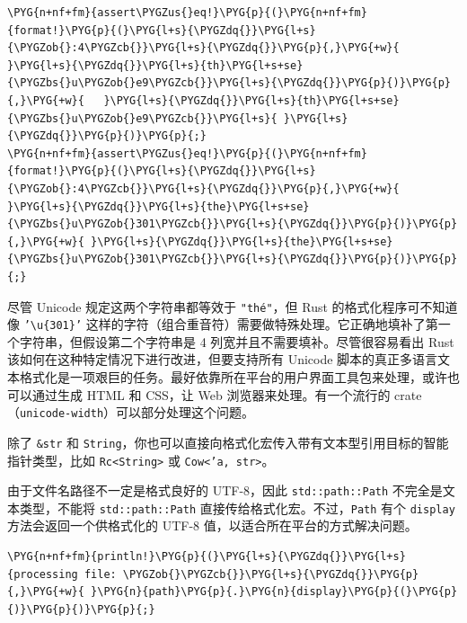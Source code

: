 \begin{Verbatim}[commandchars=\\\{\},breaklines=true,breakanywhere=true,fontsize=\codefont,xleftmargin=17bp]
\PYG{n+nf+fm}{assert\PYGZus{}eq!}\PYG{p}{(}\PYG{n+nf+fm}{format!}\PYG{p}{(}\PYG{l+s}{\PYGZdq{}}\PYG{l+s}{\PYGZob{}:4\PYGZcb{}}\PYG{l+s}{\PYGZdq{}}\PYG{p}{,}\PYG{+w}{ }\PYG{l+s}{\PYGZdq{}}\PYG{l+s}{th}\PYG{l+s+se}{\PYGZbs{}u\PYGZob{}e9\PYGZcb{}}\PYG{l+s}{\PYGZdq{}}\PYG{p}{)}\PYG{p}{,}\PYG{+w}{   }\PYG{l+s}{\PYGZdq{}}\PYG{l+s}{th}\PYG{l+s+se}{\PYGZbs{}u\PYGZob{}e9\PYGZcb{}}\PYG{l+s}{ }\PYG{l+s}{\PYGZdq{}}\PYG{p}{)}\PYG{p}{;}
\PYG{n+nf+fm}{assert\PYGZus{}eq!}\PYG{p}{(}\PYG{n+nf+fm}{format!}\PYG{p}{(}\PYG{l+s}{\PYGZdq{}}\PYG{l+s}{\PYGZob{}:4\PYGZcb{}}\PYG{l+s}{\PYGZdq{}}\PYG{p}{,}\PYG{+w}{ }\PYG{l+s}{\PYGZdq{}}\PYG{l+s}{the}\PYG{l+s+se}{\PYGZbs{}u\PYGZob{}301\PYGZcb{}}\PYG{l+s}{\PYGZdq{}}\PYG{p}{)}\PYG{p}{,}\PYG{+w}{ }\PYG{l+s}{\PYGZdq{}}\PYG{l+s}{the}\PYG{l+s+se}{\PYGZbs{}u\PYGZob{}301\PYGZcb{}}\PYG{l+s}{\PYGZdq{}}\PYG{p}{)}\PYG{p}{;}
\end{Verbatim}

尽管 Unicode 规定这两个字符串都等效于 \texttt{"thé"}，但 Rust 的格式化程序可不知道像 \texttt{'\textbackslash{}u\{301\}'} 这样的字符（组合重音符）需要做特殊处理。它正确地填补了第一个字符串，但假设第二个字符串是 4 列宽并且不需要填补。尽管很容易看出 Rust 该如何在这种特定情况下进行改进，但要支持所有 Unicode 脚本的真正多语言文本格式化是一项艰巨的任务。最好依靠所在平台的用户界面工具包来处理，或许也可以通过生成 HTML 和 CSS，让 Web 浏览器来处理。有一个流行的 crate（\texttt{unicode-width}）可以部分处理这个问题。

除了 \texttt{\&str} 和 \texttt{String}，你也可以直接向格式化宏传入带有文本型引用目标的智能指针类型，比如 \texttt{Rc<String>} 或 \texttt{Cow<'a, str>}。

由于文件名路径不一定是格式良好的 UTF-8，因此 \texttt{std::path::Path} 不完全是文本类型，不能将 \texttt{std::path::Path} 直接传给格式化宏。不过，\texttt{Path} 有个 \texttt{display} 方法会返回一个供格式化的 UTF-8 值，以适合所在平台的方式解决问题。

\begin{Verbatim}[commandchars=\\\{\},breaklines=true,breakanywhere=true,fontsize=\codefont,xleftmargin=17bp]
\PYG{n+nf+fm}{println!}\PYG{p}{(}\PYG{l+s}{\PYGZdq{}}\PYG{l+s}{processing file: \PYGZob{}\PYGZcb{}}\PYG{l+s}{\PYGZdq{}}\PYG{p}{,}\PYG{+w}{ }\PYG{n}{path}\PYG{p}{.}\PYG{n}{display}\PYG{p}{(}\PYG{p}{)}\PYG{p}{)}\PYG{p}{;}
\end{Verbatim}

